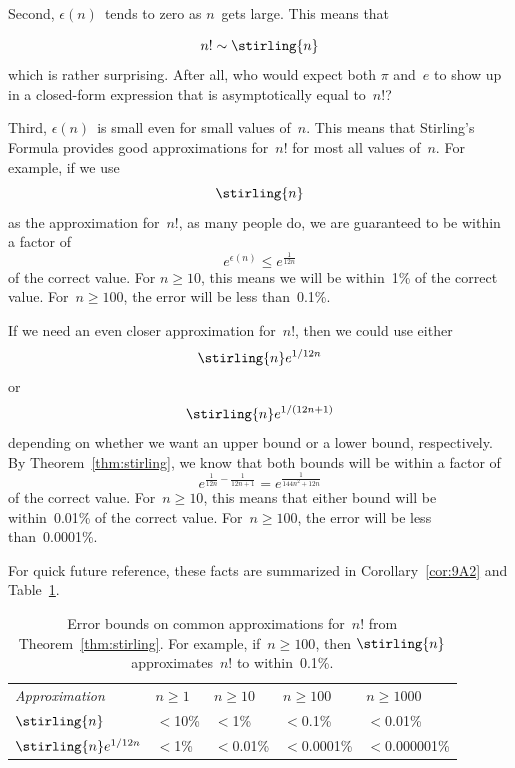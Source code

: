 Second, $\epsilon(n)$~tends to zero as $n$~gets large.  This means
that

\begin{equation}\label{nfacsim}%
    n! \sim \stirling{n}
\end{equation}
which is rather surprising.  After all, who would expect both $\pi$
and~$e$ to show up in a closed-form expression that is asymptotically
equal to~$n!$?

Third, $\epsilon(n)$~is small even for small values of~$n$.  This
means that Stirling's Formula provides good approximations for~$n!$
for most all values of~$n$.  For example, if we use
\[
    \stirling{n}
\]
as the approximation for~$n!$, as many people do, we are guaranteed
to be within a factor of
\[
    e^{\epsilon(n)} \le e^{\frac{1}{12n}}
\]
of the correct value.  For $n \ge 10$, this means we will be
within~1\% of the correct value.  For~$n \ge 100$, the error will be
less than~0.1\%.

If we need an even closer approximation for~$n!$, then we could use
either
\[
    \stirling{n} e^{1/12n}
\]
or
\[
    \stirling{n} e^{1/(12n + 1)}
\]
depending on whether we want an upper bound or a lower bound,
respectively.  By Theorem~\ref{thm:stirling}, we know that both bounds
will be within a factor of
\[
    e^{ \frac{1}{12n} - \frac{1}{12n + 1} } = e^{\frac{1}{144n^2 + 12n }}
\]
of the correct value.  For~$n \ge 10$, this means that either bound
will be within~0.01\% of the correct value.  For~$n \ge 100$, the
error will be less than~0.0001\%.

For quick future reference, these facts are summarized in
Corollary~\ref{cor:9A2} and Table~\ref{fig:9A1}.

\begin{table}\redrawntrue

\renewcommand{\arraystretch}{1.5}

\begin{tabular}{l|llll}

\multicolumn{1}{l}{\emph{Approximation}}
    & $n \ge 1$
    & $n \ge 10$
    & $n \ge 100$
    & $n \ge 1000$ \\
\cline{2-5}
$\stirling{n}$
    & ${}<{}$10\%
    & ${}<{}$1\%
    & ${}<{}$0.1\%
    & ${}<{}$0.01\%\\

$\stirling{n} e^{1/12n}$
    & ${}<{}$1\%
    & ${}<{}$0.01\%
    & ${}<{}$0.0001\%
    & ${}<{}$0.000001\%
\end{tabular}

\caption{Error bounds on common approximations for~$n!$ from
  Theorem~\ref{thm:stirling}.  For example, if~$n \ge 100$, then
  $\protect\stirling{n}$ approximates~$n!$ to within~0.1\%.}

\label{fig:9A1}

\end{table}

